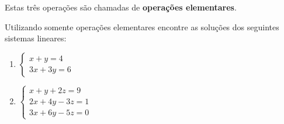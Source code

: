 Estas tr\^es opera\c{c}\~oes s\~ao chamadas de  \textbf{opera\c{c}\~oes elementares}.

\begin{exemplos}
	Utilizando somente operações elementares encontre as soluções dos seguintes sistemas lineares:
	\begin{enumerate}
		\item $\begin{cases}x + y = 4\\3x + 3y = 6\end{cases}$

		\item $\begin{cases}x + y + 2z = 9\\ 2x + 4y - 3z = 1\\ 3x + 6y - 5z = 0\end{cases}$
	\end{enumerate}


\end{exemplos}
